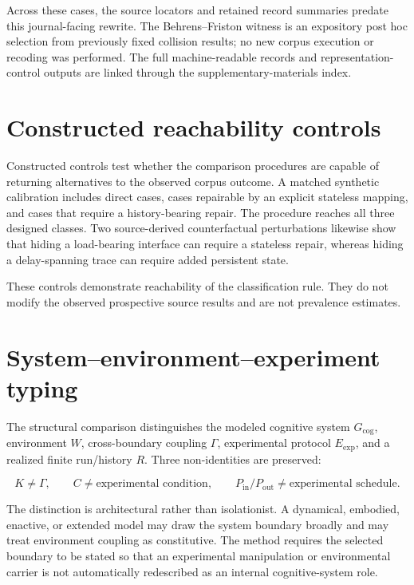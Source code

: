 \documentclass[11pt]{article}
\begin{document}
Across these cases, the source locators and retained record summaries predate this journal-facing rewrite. The Behrens--Friston witness is an expository post hoc selection from previously fixed collision results; no new corpus execution or recoding was performed. The full machine-readable records and representation-control outputs are linked through the supplementary-materials index.

\section{Constructed reachability controls}

Constructed controls test whether the comparison procedures are capable of returning alternatives to the observed corpus outcome. A matched synthetic calibration includes direct cases, cases repairable by an explicit stateless mapping, and cases that require a history-bearing repair. The procedure reaches all three designed classes. Two source-derived counterfactual perturbations likewise show that hiding a load-bearing interface can require a stateless repair, whereas hiding a delay-spanning trace can require added persistent state.

These controls demonstrate reachability of the classification rule. They do not modify the observed prospective source results and are not prevalence estimates.

\section{System--environment--experiment typing}

The structural comparison distinguishes the modeled cognitive system \(G_{\mathrm{cog}}\), environment \(W\), cross-boundary coupling \(\Gamma\), experimental protocol \(E_{\mathrm{exp}}\), and a realized finite run/history \(R\). Three non-identities are preserved:

\[
K\neq\Gamma,\qquad
C\neq\text{experimental condition},\qquad
P_{\mathrm{in}}/P_{\mathrm{out}}\neq\text{experimental schedule}.
\]

The distinction is architectural rather than isolationist. A dynamical, embodied, enactive, or extended model may draw the system boundary broadly and may treat environment coupling as constitutive. The method requires the selected boundary to be stated so that an experimental manipulation or environmental carrier is not automatically redescribed as an internal cognitive-system role.
\end{document}
